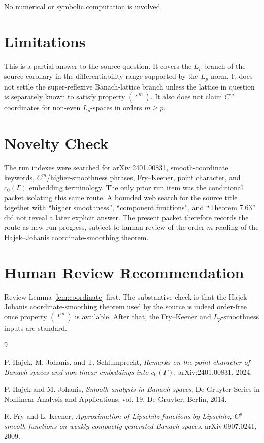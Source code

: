 \documentclass[11pt]{article}
\begin{document}
No numerical or symbolic computation is involved.

\section*{Limitations}

This is a partial answer to the source question.  It covers the \(L_p\) branch
of the source corollary in the differentiability range supported by the
\(L_p\) norm.  It does not settle the super-reflexive Banach-lattice branch
unless the lattice in question is separately known to satisfy property
\((\ast^m)\).  It also does not claim \(C^m\) coordinates for non-even
\(L_p\)-spaces in orders \(m\geq p\).

\section*{Novelty Check}

The run indexes were searched for arXiv:2401.00831, smooth-coordinate
keywords, \(C^m\)/higher-smoothness phrases, Fry--Keener, point character, and
\(c_0(\Gamma)\) embedding terminology.  The only prior run item was the
conditional packet isolating this same route.  A bounded web search for the
source title together with ``higher smoothness'', ``component functions'', and
``Theorem 7.63'' did not reveal a later explicit answer.  The present packet
therefore records the route as new run progress, subject to human review of
the order-\(m\) reading of the Hajek--Johanis coordinate-smoothing theorem.

\section*{Human Review Recommendation}

Review Lemma \ref{lem:coordinate} first.  The substantive check is that the
Hajek--Johanis coordinate-smoothing theorem used by the source is indeed
order-free once property \((\ast^m)\) is available.  After that, the
Fry--Keener and \(L_p\)-smoothness inputs are standard.

\begin{thebibliography}{9}

P. Hajek, M. Johanis, and T. Schlumprecht,
\emph{Remarks on the point character of Banach spaces and non-linear
embeddings into \(c_0(\Gamma)\)},
arXiv:2401.00831, 2024.

P. Hajek and M. Johanis,
\emph{Smooth analysis in Banach spaces},
De Gruyter Series in Nonlinear Analysis and Applications, vol. 19,
De Gruyter, Berlin, 2014.

R. Fry and L. Keener,
\emph{Approximation of Lipschitz functions by Lipschitz, \(C^p\) smooth
functions on weakly compactly generated Banach spaces},
arXiv:0907.0241, 2009.

\end{thebibliography}
\end{document}
